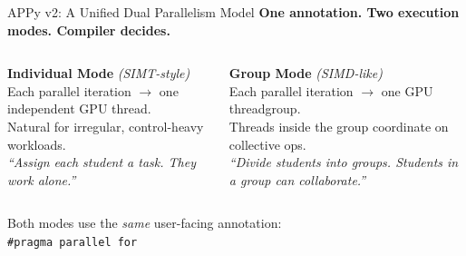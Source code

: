 \documentclass[aspectratio=169]{beamer}
\begin{document}
\begin{frame}[fragile]{APPy v2: A Unified Dual Parallelism Model}
  \textbf{One annotation. Two execution modes. Compiler decides.}

  \vspace{1em}
  \begin{columns}
    \textbf{Individual Mode} \emph{(SIMT-style)}\\
    Each parallel iteration $\to$ one independent GPU thread.\\
    Natural for irregular, control-heavy workloads.\\
    \vspace{0.5em}
    \emph{``Assign each student a task. They work alone.''}

    \textbf{Group Mode} \emph{(SIMD-like)}\\
    Each parallel iteration $\to$ one GPU threadgroup.\\
    Threads inside the group coordinate on collective ops.\\
    \vspace{0.5em}
    \emph{``Divide students into groups. Students in a group can collaborate.''}
  \end{columns}

  \vspace{1.5em}
  \begin{center}
  Both modes use the \emph{same} user-facing annotation:\\[0.5em]
  \texttt{#pragma parallel for}
  \end{center}
\end{frame}
\end{document}
